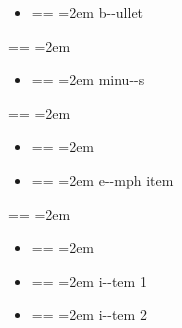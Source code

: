 \documentclass{book}
\makeatletter
\newenvironment{GNUTexinfopreformatted}{%
  \par\obeylines\obeyspaces\frenchspacing
  \parskip=\z@\parindent=\z@}{}
\makeatother
\begin{document}
\begin{itemize}[label=\textbullet{}]
\item \begin{GNUTexinfopreformatted}
\leftskip=2em\relax\ttfamily%
b{-}{-}ullet
\end{GNUTexinfopreformatted}
\end{itemize}
\begin{GNUTexinfopreformatted}
\leftskip=2em\relax\ttfamily%

\end{GNUTexinfopreformatted}
\begin{itemize}[label=-]
\item \begin{GNUTexinfopreformatted}
\leftskip=2em\relax\ttfamily%
minu{-}{-}s
\end{GNUTexinfopreformatted}
\end{itemize}
\begin{GNUTexinfopreformatted}
\leftskip=2em\relax\ttfamily%

\end{GNUTexinfopreformatted}
\begin{itemize}[label=\emph{after emph}]
\item \begin{GNUTexinfopreformatted}
\leftskip=2em\relax\ttfamily%
\end{GNUTexinfopreformatted}
\item \begin{GNUTexinfopreformatted}
\leftskip=2em\relax\ttfamily%
e{-}{-}mph item
\end{GNUTexinfopreformatted}
\end{itemize}
\begin{GNUTexinfopreformatted}
\leftskip=2em\relax\ttfamily%

\end{GNUTexinfopreformatted}
\begin{itemize}[label=\textbullet{} a--n itemize line]
\item \begin{GNUTexinfopreformatted}
\leftskip=2em\relax\ttfamily%
\end{GNUTexinfopreformatted}
\item \begin{GNUTexinfopreformatted}
\leftskip=2em\relax\ttfamily%
%
i{-}{-}tem 1
\end{GNUTexinfopreformatted}
\item \begin{GNUTexinfopreformatted}
\leftskip=2em\relax\ttfamily%
i{-}{-}tem 2
\end{GNUTexinfopreformatted}
\end{itemize}
\end{document}
